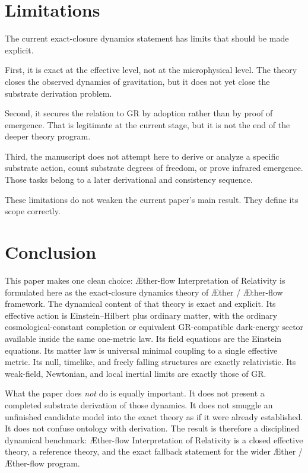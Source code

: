 \documentclass[11pt]{article}
\newcommand{\Aether}{\AE{}ther}
\newcommand{\Aflow}{\AE{}ther-flow}
\newcommand{\TheoryName}{\Aflow{} Interpretation of Relativity}
\newcommand{\TheoryProgram}{\Aether{} / \Aflow{} framework}
\begin{document}
\section{Limitations}

The current exact-closure dynamics statement has limits that should be made explicit.

First, it is exact at the effective level, not at the microphysical level. The theory closes the observed dynamics of gravitation, but it does not yet close the substrate derivation problem.

Second, it secures the relation to GR by adoption rather than by proof of emergence. That is legitimate at the current stage, but it is not the end of the deeper theory program.

Third, the manuscript does not attempt here to derive or analyze a specific substrate action, count substrate degrees of freedom, or prove infrared emergence. Those tasks belong to a later derivational and consistency sequence.

These limitations do not weaken the current paper's main result. They define its scope correctly.

\section{Conclusion}

This paper makes one clean choice: \TheoryName{} is formulated here as the exact-closure dynamics theory of \TheoryProgram{}. The dynamical content of that theory is exact and explicit. Its effective action is Einstein--Hilbert plus ordinary matter, with the ordinary cosmological-constant completion or equivalent GR-compatible dark-energy sector available inside the same one-metric law. Its field equations are the Einstein equations. Its matter law is universal minimal coupling to a single effective metric. Its null, timelike, and freely falling structures are exactly relativistic. Its weak-field, Newtonian, and local inertial limits are exactly those of GR.

What the paper does \emph{not} do is equally important. It does not present a completed substrate derivation of those dynamics. It does not smuggle an unfinished candidate model into the exact theory as if it were already established. It does not confuse ontology with derivation. The result is therefore a disciplined dynamical benchmark: \TheoryName{} is a closed effective theory, a reference theory, and the exact fallback statement for the wider \Aether{} / \Aflow{} program.


\end{document}
